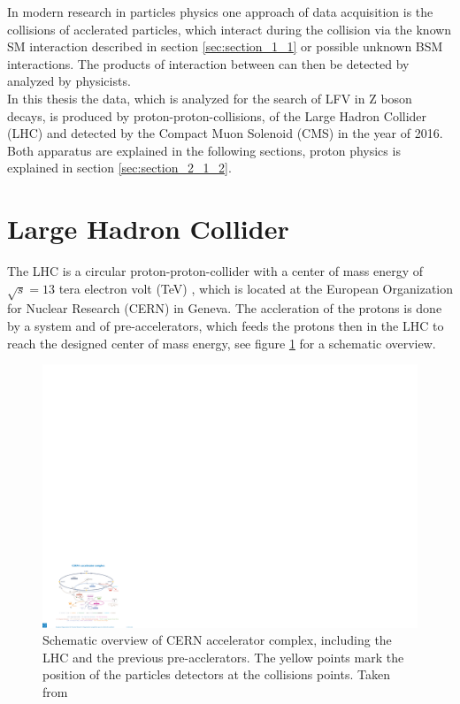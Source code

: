 In modern research in particles physics one approach of data acquisition is the collisions of acclerated particles, which interact during the collision via the known \acs{SM} interaction described in section \ref{sec:section_1_1} or possible unknown \acs{BSM} interactions. The products of interaction between can then be detected by analyzed by physicists. \\

In this thesis the data, which is analyzed for the search of \acs{LFV} in Z boson decays, is produced by proton-proton-collisions, of the Large Hadron Collider (\acs{LHC}) \cite{LHC} and detected by the Compact Muon Solenoid (\acs{CMS}) \cite{CMS} in the year of 2016. Both apparatus are explained in the following sections, proton physics is explained in section \ref{sec:section_2_1_2}.


\section{Large Hadron Collider}
\label{sec:section_2_1}

The \acs{LHC} is a circular proton-proton-collider with a center of mass energy of $\sqrt{s} = 13$ tera electron volt (\acs{TeV}) \cite{LHC2}, which is located at the European Organization for Nuclear Research (\acs{CERN}) in Geneva. The accleration of the protons is done by a system and of pre-accelerators, which feeds the protons then in the LHC to reach the designed center of mass energy, see figure \ref{fig:fig_2_1} for a schematic overview. \\

\begin{figure}[ht]
	\centering
	\includegraphics[width=1.0\textwidth]{pictures/LHC.pdf}

	\caption[Schematic overview of CERN accelerator complex]{Schematic overview of \acs{CERN} accelerator complex, including the \acs{LHC} and the previous pre-acclerators. The yellow points mark the position of the particles detectors at the collisions points. Taken from \cite{LHCACCL}}
	\label{fig:fig_2_1}
\end{figure}

